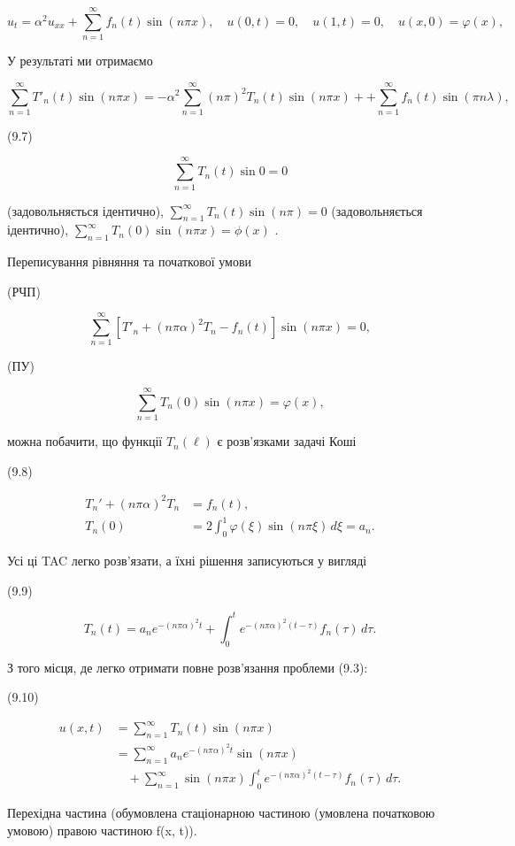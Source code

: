 \[
u_{t} = \alpha^{2} u_{xx} + \sum_{n=1}^{\infty} f_{n}(t) \sin(n\pi x),
\quad u(0, t) = 0, \quad u(1, t) = 0, \quad u(x, 0) = \varphi(x),
\]

У результаті ми отримаємо

\[
\sum_{n=1}^{\infty} T'_n(t) \sin(n\pi x) = -\alpha^2 \sum_{n=1}^{\infty} (n\pi)^2 T_n(t) \sin(n\pi x) + + \sum_{n=1}^{\infty} f_n(t) \sin(\pi n\lambda),
\]

(9.7)

\[
\sum_{n=1}^{\infty} T_n(t) \sin 0 = 0
\]

(задовольняється ідентично), \(\sum_{n=1}^{\infty} T_n(t) \sin (n\pi) = 0\) (задовольняється ідентично), \(\sum_{n=1}^{\infty} T_n(0) \sin (n\pi x) = \phi(x)\) .

Переписування рівняння та початкової умови

(РЧП)

\[
\sum_{n=1}^{\infty} [T'_n + (n\pi\alpha)^2 T_n - f_n(t)] \sin(n\pi x) = 0,
\]

(ПУ)

\[
\sum_{n=1}^{\infty} T_n(0) \sin(n\pi x) = \varphi(x),
\]

можна побачити, що функції \(T_n(\ell)\) є розв'язками задачі Коші

(9.8)

\[
\begin{aligned}
T_n' + (n\pi\alpha)^2 T_n &= f_n(t), \\
T_n(0) &= 2 \int_0^1 \varphi(\xi)\sin(n\pi \xi)\,d\xi = a_n.
\end{aligned}
\]

Усі ці TAC легко розв'язати, а їхні рішення записуються у вигляді

(9.9)

\[
T_n(t) = a_n e^{-(n\pi\alpha)^2 t} + \int_0^t e^{-(n\pi\alpha)^2 (t-\tau)} f_n(\tau)\,d\tau.
\]

З того місця, де легко отримати повне розв'язання проблеми (9.3):

(9.10)

\[
\begin{aligned}
u(x, t) &= \sum_{n=1}^{\infty} T_n(t)\sin(n\pi x) \\
&= \sum_{n=1}^{\infty} a_n e^{-(n\pi\alpha)^2 t}\sin(n\pi x) \\
&\quad + \sum_{n=1}^{\infty} \sin(n\pi x)\int_0^t e^{-(n\pi\alpha)^2 (t-\tau)} f_n(\tau)\,d\tau.
\end{aligned}
\]

Перехідна частина (обумовлена стаціонарною частиною (умовлена початковою умовою) правою частиною f(x, t)).

